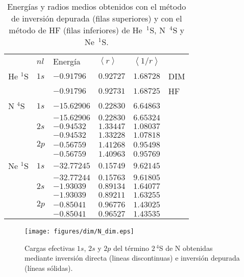 \begin{table}[t]
\begin{center}
\begin{tabularx}{\textwidth}{
>{\centering\arraybackslash}p{}
>{\centering\arraybackslash}p{}
>{\centering\arraybackslash}p{}
>{\centering\arraybackslash}p{}
>{\centering\arraybackslash}p{}
>{\centering\arraybackslash}p{}}
\rowcolor{mydarkgray} 
         & $nl$ & Energía & $\left<r\right>$ & $\left<1/r\right>$ & \\
He $^1$S & $1s$ & $-0.91796$  & $0.92727$ & $1.68728$ & DIM\\
\rowcolor{mygray} 
         &      & $-0.91796$  & $0.92731$ & $1.68725$ & HF \\
N $^4$S  & $1s$ & $-15.62906$  & $0.22830$ & $6.64863$ &  \\
\rowcolor{mygray} 
         &      & $-15.62906$  & $0.22830$ & $6.65324$ &   \\
         & $2s$ & $-0.94532$  & $1.33447$ & $1.08037$ & \\
\rowcolor{mygray} 
         &      & $-0.94532$  & $1.33228$ & $1.07818$  &  \\
         & $2p$ & $-0.56759$  & $1.41268$ & $0.95498$  & \\
\rowcolor{mygray} 
         &      & $-0.56759$  & $1.40963$ & $0.95769$   & \\
Ne $^1$S & $1s$ & $-32.77245$ & $0.15749$ & $9.62145$  & \\
\rowcolor{mygray} 
         &      & $-32.77244$ & $0.15763$ & $9.61805$ &  \\
         & $2s$ & $-1.93039$  & $0.89134$ & $1.64077$ &  \\
\rowcolor{mygray} 
         &      & $-1.93039$  & $0.89211$ & $1.63255$ &  \\  
         & $2p$ & $-0.85041$  & $0.96776$ & $1.43025$  & \\
\rowcolor{mygray} 
         &      & $-0.85041$  & $0.96527$ & $1.43535$  & \\
\end{tabularx}
\caption[Energías y radios medios obtenidos con DIM y HF en He.]
{Energías y radios medios obtenidos con el método de inversión depurada 
(filas superiores) y con el método de HF (filas inferiores) de 
He~$^1$S, N~$^4$S y Ne~$^1$S.}
\label{tab:results-atoms}
\end{center}
\end{table}
\begin{figure}[t]
\centering
\texttt{[image: figures/dim/N\_dim.eps]}
\caption[Cargas efectivas DIM de nitrógeno.]
{Cargas efectivas $1s$, $2s$ y $2p$ del término $2\,^4$S de N obtenidas 
mediante inversión directa (lineas discontinuas) e inversión depurada 
(líneas sólidas).}
\label{fig:Nzeff}
\end{figure}


